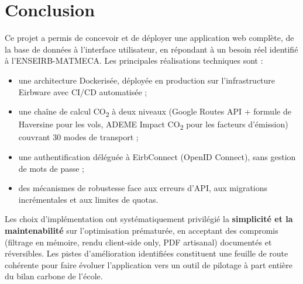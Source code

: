 \documentclass[11pt,a4paper]{article}
\begin{document}


\newpage
\section{Conclusion}

Ce projet a permis de concevoir et de déployer une application web complète, de la base de données à l'interface utilisateur, en répondant à un besoin réel identifié à l'ENSEIRB-MATMECA. Les principales réalisations techniques sont :

\begin{itemize}
  \item une architecture Dockerisée, déployée en production sur l'infrastructure Eirbware avec CI/CD automatisée ;
  \item une chaîne de calcul CO\textsubscript{2} à deux niveaux (Google Routes API + formule de Haversine pour les vols, ADEME Impact CO\textsubscript{2} pour les facteurs d'émission) couvrant 30 modes de transport ;
  \item une authentification déléguée à EirbConnect (OpenID Connect), sans gestion de mots de passe ;
  \item des mécanismes de robustesse face aux erreurs d'API, aux migrations incrémentales et aux limites de quotas.
\end{itemize}

Les choix d'implémentation ont systématiquement privilégié la \textbf{simplicité et la maintenabilité} sur l'optimisation prématurée, en acceptant des compromis (filtrage en mémoire, rendu client-side only, PDF artisanal) documentés et réversibles. Les pistes d'amélioration identifiées constituent une feuille de route cohérente pour faire évoluer l'application vers un outil de pilotage à part entière du bilan carbone de l'école.
\end{document}
